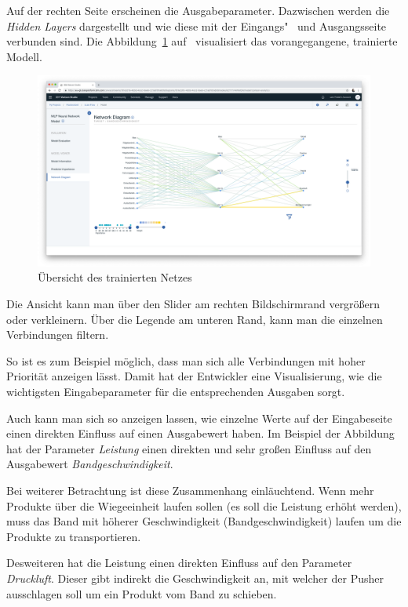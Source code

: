 Auf der rechten Seite erscheinen die Ausgabeparameter. Dazwischen werden die \textit{Hidden Layers} dargestellt und wie
diese mit der Eingangs"~ und Ausgangsseite verbunden sind. Die Abbildung~\ref{fig:umsetzung_model_network_diagram}
auf~\pageref{fig:umsetzung_model_network_diagram} visualisiert das vorangegangene, trainierte Modell.

\begin{figure}[h]
    \centering
    \includegraphics[width=\textwidth]{images/kapitel_3/model_network_diagram.png}
    \caption{Übersicht des trainierten Netzes}
    \label{fig:umsetzung_model_network_diagram}
\end{figure}

Die Ansicht kann man über den Slider am rechten Bildschirmrand vergrößern oder verkleinern. Über die Legende am unteren
Rand, kann man die einzelnen Verbindungen filtern.

So ist es zum Beispiel möglich, dass man sich alle Verbindungen mit hoher Priorität anzeigen lässt. Damit hat der
Entwickler eine Visualisierung, wie die wichtigsten Eingabeparameter für die entsprechenden Ausgaben sorgt.

Auch kann man sich so anzeigen lassen, wie einzelne Werte auf der Eingabeseite einen direkten Einfluss auf einen
Ausgabewert haben. Im Beispiel der Abbildung hat der Parameter \textit{Leistung} einen direkten und sehr großen
Einfluss auf den Ausgabewert \textit{Bandgeschwindigkeit}.

Bei weiterer Betrachtung ist diese Zusammenhang einläuchtend. Wenn mehr Produkte über die Wiegeeinheit laufen sollen (es
soll die Leistung erhöht werden), muss das Band mit höherer Geschwindigkeit (Bandgeschwindigkeit) laufen um die Produkte
zu transportieren.

Desweiteren hat die Leistung einen direkten Einfluss auf den Parameter \textit{Druckluft}. Dieser gibt indirekt die
Geschwindigkeit an, mit welcher der Pusher ausschlagen soll um ein Produkt vom Band zu schieben.

